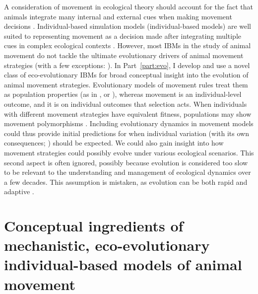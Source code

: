 A consideration of movement in ecological theory should account for the fact that animals integrate many internal and external cues when making movement decisions \citep{nathan2008a}.
Individual-based simulation models (individual-based models) are well suited to representing movement as a decision made after integrating multiple cues in complex ecological contexts \citep{huston1988,deangelis2019}.
However, most IBMs in the study of animal movement do not tackle the ultimate evolutionary drivers of animal movement strategies (with a few exceptions: \cite{getz2015,getz2016,netz2021}).
In Part~\ref{part:evo}, I develop and use a novel class of eco-evolutionary IBMs for broad conceptual insight into the evolution of animal movement strategies.
Evolutionary models of movement rules treat them as population properties (as in \cite[]{dejager2011,dejager2020}, or \cite[]{morris2011}), whereas movement is an individual-level outcome, and it is on individual outcomes that selection acts.
When individuals with different movement strategies have equivalent fitness, populations may show movement polymorphisms \citep{wolf2012,shaw2020,getz2015}.
Including evolutionary dynamics in movement models could thus provide initial predictions for when individual variation (with its own consequences; \cite{spiegel2017}) should be expected.
We could also gain insight into how movement strategies could possibly evolve under various ecological scenarios.
This second aspect is often ignored, possibly because evolution is considered too slow to be relevant to the understanding and management of ecological dynamics over a few decades.
This assumption is mistaken, as evolution can be both rapid and adaptive \citep[][]{bonnet2022}.

\section*{Conceptual ingredients of mechanistic, eco-evolutionary individual-based models of animal movement}

